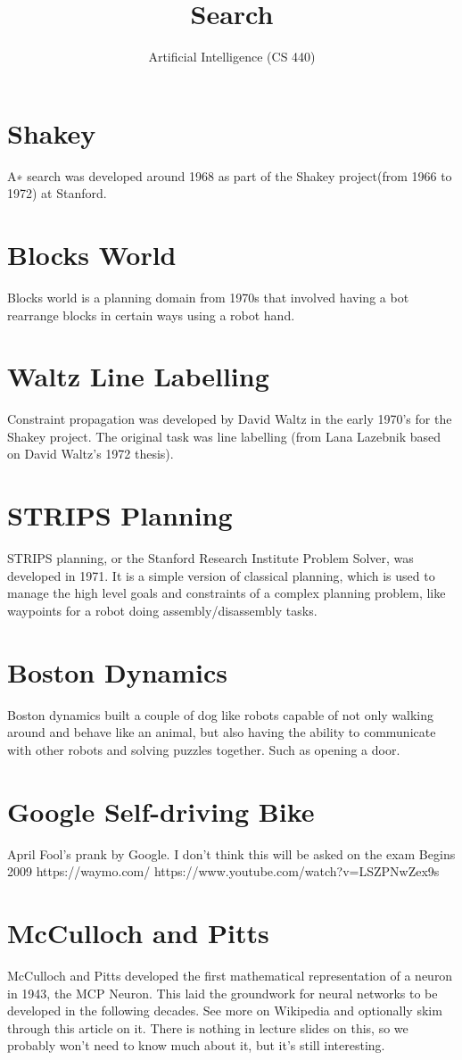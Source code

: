 \documentclass[11pt]{article}
\title{Search}
\author{Artificial Intelligence (CS 440)}
\begin{document}
  \maketitle
  \tableofcontents

  \section{Shakey}
    A∗ search was developed around 1968 as part of the
    Shakey project(from 1966 to 1972) at Stanford.

  \section{Blocks World}
    Blocks world is a planning domain from 1970s that involved
    having a bot rearrange blocks in certain ways using a robot hand.

  \section{Waltz Line Labelling}
    Constraint propagation was developed by David Waltz
    in the early 1970's for the Shakey project. The original
    task was line labelling (from Lana Lazebnik based on
    David Waltz's 1972 thesis).

  \section{STRIPS Planning}
    STRIPS planning, or the Stanford Research Institute Problem Solver,
    was developed in 1971. It is a simple version of classical planning,
    which is used to manage the high level goals and constraints of a
    complex planning problem, like waypoints for a
    robot doing assembly/disassembly tasks.

  \section{Boston Dynamics}
    Boston dynamics built a couple of dog like robots capable of not
    only walking around and behave like an animal, but also having
    the ability to communicate with other robots and solving puzzles together.
    Such as opening a door.

  \section{Google Self-driving Bike}
    April Fool’s prank by Google. I don’t think this will be asked on the exam
    Begins 2009
    https://waymo.com/
    https://www.youtube.com/watch?v=LSZPNwZex9s

  \section{McCulloch and Pitts}
    McCulloch and Pitts developed the first mathematical representation of
    a neuron in 1943, the MCP Neuron. This laid the groundwork for neural
    networks to be developed in the following decades. See more on Wikipedia
    and optionally skim through this article on it. There is nothing in lecture
    slides on this, so we probably won’t need to know much about it,
    but it's still interesting.
\end{document}
